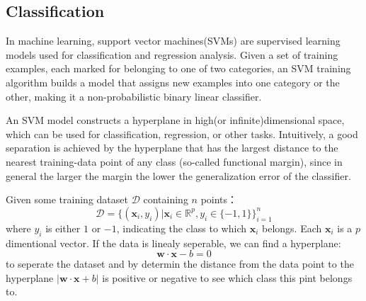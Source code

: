 \documentclass{vldb}
\begin{document}
\subsection{Classification}
In machine learning, support vector machines(SVMs) are supervised learning models used for classification and regression analysis. Given a set of training examples, each marked for belonging to one of two categories, an SVM training algorithm builds a model that assigns new examples into one category or the other, making it a non-probabilistic binary linear classifier. 
\par An SVM model constructs a hyperplane in high(or infinite)dimensional space, which can be used for classification, regression, or other tasks. Intuitively, a good separation is achieved by the hyperplane that has the largest distance to the nearest training-data point of any class (so-called functional margin), since in general the larger the margin the lower the generalization error of the classifier.
\par Given some training dataset $\mathcal{D}$ containing $n$ points：
\begin{displaymath}
\mathcal{D} = \{(\mathbf{x}_i,y_i)|\mathbf{x}_i \in \mathbb{R}^p,y_i\in\{-1,1\}\}^n _{i=1}
\end{displaymath}
where $y_i$ is either $1$ or $-1$, indicating the class to which $\mathbf{x}_i$ belongs. Each $\mathbf{x}_i$ is a $p$ dimentional vector. If the data is linealy seperable, we can find a hyperplane:
\begin{displaymath}
\mathbf{w}\cdot\mathbf{x}-b=0 
\end{displaymath}
to seperate the dataset and by determin the distance from the data point to the hyperplane $|\mathbf{w}\cdot\mathbf{x}+b|$ is positive or negative to see which class this pint belongs to.
\end{document}

